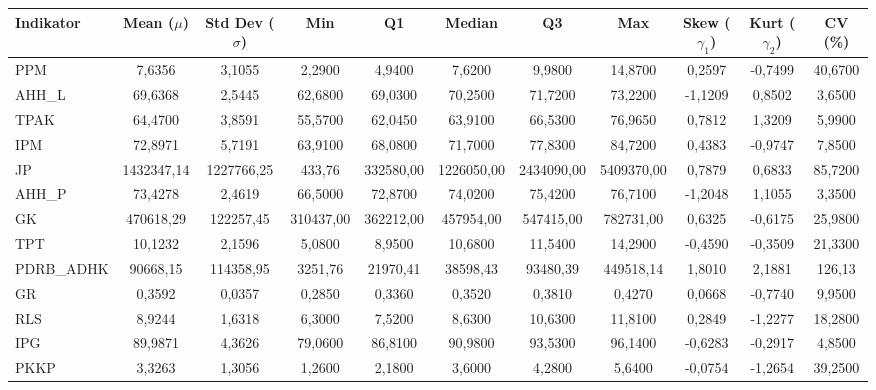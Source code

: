 \begin{adjustbox}{max width=\textwidth}
\small
\begin{tabular}{|>{\centering\arraybackslash}p{2.5cm}|c|c|c|c|c|c|c|c|c|c|}
\hline
\textbf{Indikator} & \textbf{Mean ($\mu$)} & \textbf{Std Dev ($\sigma$)} & \textbf{Min} & \textbf{Q1} & \textbf{Median} & \textbf{Q3} & \textbf{Max} & \textbf{Skew ($\gamma_1$)} & \textbf{Kurt ($\gamma_2$)} & \textbf{CV (\%)} \\
\hline
PPM & 7,6356 & 3,1055 & 2,2900 & 4,9400 & 7,6200 & 9,9800 & 14,8700 & 0,2597 & -0,7499 & 40,6700 \\
AHH\_L & 69,6368 & 2,5445 & 62,6800 & 69,0300 & 70,2500 & 71,7200 & 73,2200 & -1,1209 & 0,8502 & 3,6500 \\
TPAK & 64,4700 & 3,8591 & 55,5700 & 62,0450 & 63,9100 & 66,5300 & 76,9650 & 0,7812 & 1,3209 & 5,9900 \\
IPM & 72,8971 & 5,7191 & 63,9100 & 68,0800 & 71,7000 & 77,8300 & 84,7200 & 0,4383 & -0,9747 & 7,8500 \\
JP & 1432347,14 & 1227766,25 & 433,76 & 332580,00 & 1226050,00 & 2434090,00 & 5409370,00 & 0,7879 & 0,6833 & 85,7200 \\
AHH\_P & 73,4278 & 2,4619 & 66,5000 & 72,8700 & 74,0200 & 75,4200 & 76,7100 & -1,2048 & 1,1055 & 3,3500 \\
GK & 470618,29 & 122257,45 & 310437,00 & 362212,00 & 457954,00 & 547415,00 & 782731,00 & 0,6325 & -0,6175 & 25,9800 \\
TPT & 10,1232 & 2,1596 & 5,0800 & 8,9500 & 10,6800 & 11,5400 & 14,2900 & -0,4590 & -0,3509 & 21,3300 \\
PDRB\_ADHK & 90668,15 & 114358,95 & 3251,76 & 21970,41 & 38598,43 & 93480,39 & 449518,14 & 1,8010 & 2,1881 & 126,13 \\
GR & 0,3592 & 0,0357 & 0,2850 & 0,3360 & 0,3520 & 0,3810 & 0,4270 & 0,0668 & -0,7740 & 9,9500 \\
RLS & 8,9244 & 1,6318 & 6,3000 & 7,5200 & 8,6300 & 10,6300 & 11,8100 & 0,2849 & -1,2277 & 18,2800 \\
IPG & 89,9871 & 4,3626 & 79,0600 & 86,8100 & 90,9800 & 93,5300 & 96,1400 & -0,6283 & -0,2917 & 4,8500 \\
PKKP & 3,3263 & 1,3056 & 1,2600 & 2,1800 & 3,6000 & 4,2800 & 5,6400 & -0,0754 & -1,2654 & 39,2500 \\
\hline
\end{tabular}
\end{adjustbox}
